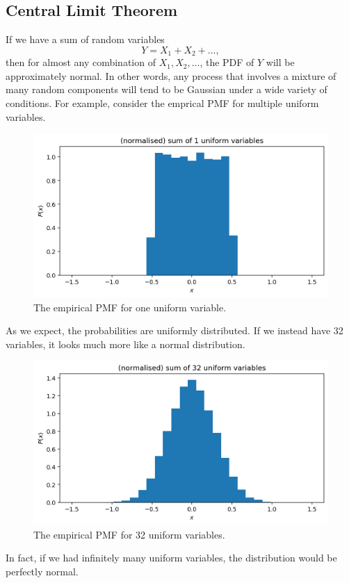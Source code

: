 \documentclass[a4paper, openany]{memoir}
\begin{document}
\subsection{Central Limit Theorem}
If we have a sum of random variables
\[Y = X_1 + X_2 + \dots, \]
then for almost any combination of $X_1, X_2, \dots$, the PDF of $Y$ will be approximately normal. In other words, any process that involves a mixture of many random components will tend to be Gaussian under a wide variety of conditions. For example, consider the emprical PMF for multiple uniform variables.
\begin{figure}[H]
    \centering
    \includegraphics[scale=0.5]{src/5.17 sum of 1 uniform variable.png}
    \caption{The empirical PMF for one uniform variable.}
\end{figure}
\noindent As we expect, the probabilities are uniformly distributed. If we instead have 32 variables, it looks much more like a normal distribution.
\begin{figure}[H]
    \centering
    \includegraphics[scale=0.5]{src/5.18 sum of 32 uniform variables.png}
    \caption{The empirical PMF for 32 uniform variables.}
\end{figure}
\noindent In fact, if we had infinitely many uniform variables, the distribution would be perfectly normal.
\end{document}

